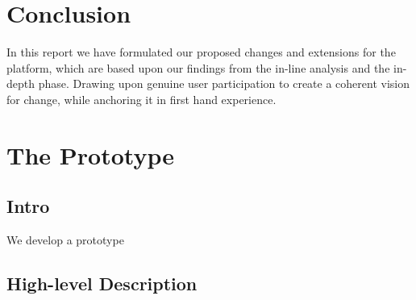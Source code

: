 \documentclass[a4paper,11pt]{article}
\begin{document}
\section{Conclusion}
In this report we have formulated our proposed changes and extensions for the platform, which are based upon our findings from the in-line analysis and the in-depth phase. Drawing upon genuine user participation to create a coherent vision for change, while anchoring it in first hand experience.\\

\newpage

\section{The Prototype}
\subsection{Intro}








We develop a prototype

\subsection{High-level Description}
\end{document}

